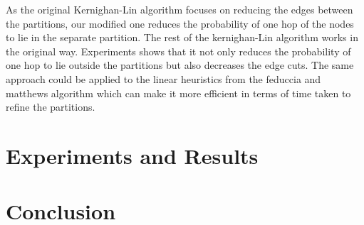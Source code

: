 \documentclass[letterpaper]{article}
\begin{document}
    As the original Kernighan-Lin algorithm focuses on reducing the edges
between the partitions, our modified one reduces the probability of one hop of
the nodes to lie in the separate partition.  The rest of the kernighan-Lin
algorithm works in the original way. Experiments shows that it not only reduces
the probability of one hop to lie outside the partitions but also decreases the
edge cuts. The same approach could be applied to the linear heuristics from the
feduccia and matthews algorithm\cite{23} which can make it more efficient in
terms of time taken to refine the partitions.
 




\section{Experiments and Results}

\section{Conclusion}
 
\end{document}
